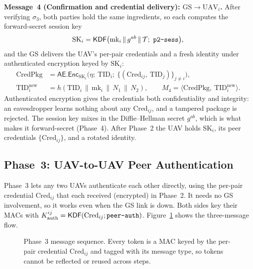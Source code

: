 \documentclass[11pt,a4paper]{article}
\begin{document}
\textbf{Message~4 (Confirmation and credential delivery): $\text{GS} \rightarrow \text{UAV}_i$.}
After verifying $\sigma_3$, both parties hold the same ingredients, so each
computes the forward-secret session key
\begin{equation}
\text{SK}_i = \mathsf{KDF}\big(\text{mk}_i \,\|\, g^{ab} \,\|\, \mathcal{T};\ \texttt{p2\text{-}sess}\big),
\label{eq:sk_p2}
\end{equation}
and the GS delivers the UAV's per-pair credentials and a fresh identity under
authenticated encryption keyed by $\text{SK}_i$:
\begin{align}
\text{CredPkg} &= \mathsf{AE}.\mathsf{Enc}_{\text{SK}_i}\big(\eta;\ \text{TID}_i;\ \{(\text{Cred}_{ij},\ \text{TID}_j)\}_{j\neq i}\big), \\[1ex]
\text{TID}_i^{\text{new}} &= h(\text{TID}_i \,\|\, \text{mk}_i \,\|\, N_1 \,\|\, N_2), \qquad
M_4 = \langle \text{CredPkg},\ \text{TID}_i^{\text{new}} \rangle.
\end{align}
Authenticated encryption gives the credentials both confidentiality and
integrity: an eavesdropper learns nothing about any $\text{Cred}_{ij}$, and a
tampered package is rejected. The session key mixes in the Diffie--Hellman
secret $g^{ab}$, which is what makes it forward-secret (Phase~4). After
Phase~2 the UAV holds $\text{SK}_i$, its peer credentials
$\{\text{Cred}_{ij}\}$, and a rotated identity.

\subsection{Phase~3: UAV-to-UAV Peer Authentication}
\label{subsec:phase3}

Phase~3 lets any two UAVs authenticate each other directly, using the per-pair
credential $\text{Cred}_{ij}$ that each received (encrypted) in Phase~2. It
needs no GS involvement, so it works even when the GS link is down. Both sides
key their MACs with
$K^{ij}_{\text{auth}}=\mathsf{KDF}(\text{Cred}_{ij};\texttt{peer\text{-}auth})$.
Figure~\ref{fig:phase3} shows the three-message flow.

\begin{figure}[H]
\centering
{}
\caption{Phase~3 message sequence. Every token is a MAC keyed by the per-pair
credential $\text{Cred}_{ij}$ and tagged with its message type, so tokens
cannot be reflected or reused across steps.}
\label{fig:phase3}
\end{figure}
\end{document}
